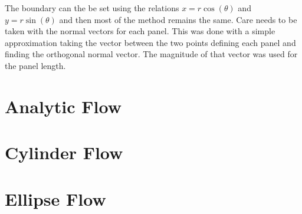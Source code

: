 \documentclass{report}
\begin{document}
The boundary can the be set using the relations $x = r\cos(\theta)$ and $y = r\sin(\theta)$ and then most of the method remains the same.
Care needs to be taken with the normal vectors for each panel.
This was done with a simple approximation taking the vector between the two points defining each panel and finding the orthogonal normal vector.
The magnitude of that vector was used for the panel length.

\clearpage

\appendix

\chapter{Analytic Flow}
   
\chapter{Cylinder Flow}
   
\chapter{Ellipse Flow}
   
\end{document}
